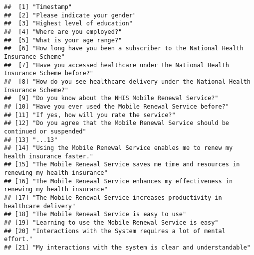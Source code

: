 \documentclass[
]{article}
\begin{document}
\begin{verbatim}
##  [1] "Timestamp"                                                                                                        
##  [2] "Please indicate your gender"                                                                                      
##  [3] "Highest level of education"                                                                                       
##  [4] "Where are you employed?"                                                                                          
##  [5] "What is your age range?"                                                                                          
##  [6] "How long have you been a subscriber to the National Health Insurance Scheme"                                      
##  [7] "Have you accessed healthcare under the National Health Insurance Scheme before?"                                  
##  [8] "How do you see healthcare delivery under the National Health Insurance Scheme?"                                   
##  [9] "Do you know about the NHIS Mobile Renewal Service?"                                                               
## [10] "Have you ever used the Mobile Renewal Service before?"                                                            
## [11] "If yes, how will you rate the service?"                                                                           
## [12] "Do you agree that the Mobile Renewal Service should be continued or suspended"                                    
## [13] "...13"                                                                                                            
## [14] "Using the Mobile Renewal Service enables me to renew my health insurance faster."                                 
## [15] "The Mobile Renewal Service saves me time and resources in renewing my health insurance"                           
## [16] "The Mobile Renewal Service enhances my effectiveness in renewing my health insurance"                             
## [17] "The Mobile Renewal Service increases productivity in healthcare delivery"                                         
## [18] "The Mobile Renewal Service is easy to use"                                                                        
## [19] "Learning to use the Mobile Renewal Service is easy"                                                               
## [20] "Interactions with the System requires a lot of mental effort."                                                    
## [21] "My interactions with the system is clear and understandable"                                                      

\end{verbatim}
\end{document}
